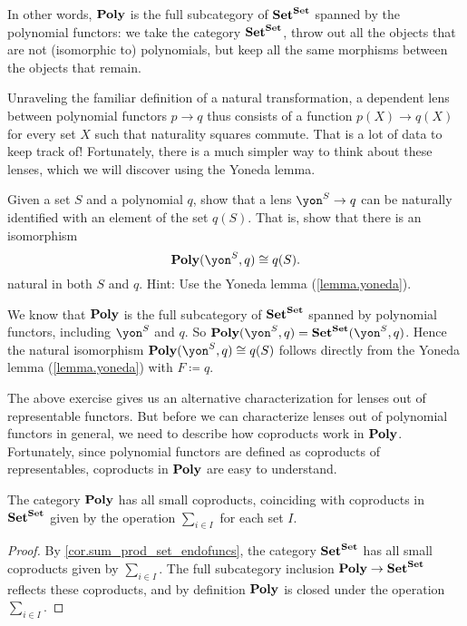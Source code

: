 \documentclass[Book-Poly]{subfiles}
\begin{document}
In other words, $\mathbf{Poly}$ is the full subcategory of $\mathbf{Set}^{\mathbf{Set}}$ spanned by the polynomial functors: we take the category $\mathbf{Set}^{\mathbf{Set}}$, throw out all the objects that are not (isomorphic to) polynomials, but keep all the same morphisms between the objects that remain.


Unraveling the familiar definition of a natural transformation, a dependent lens between polynomial functors $p \to q$ thus consists of a function $p(X) \to q(X)$ for every set $X$ such that naturality squares commute.
That is a lot of data to keep track of!
Fortunately, there is a much simpler way to think about these lenses, which we will discover using the Yoneda lemma.


\begin{exercise} \label{exc.poly_morph_yoneda}
Given a set $S$ and a polynomial $q$, show that a lens $\yon^S \to q$ can be naturally identified with an element of the set $q(S)$.
That is, show that there is an isomorphism
\[
    \poly(\yon^S, q) \iso q(S).
\]
natural in both $S$ and $q$.
Hint: Use the Yoneda lemma (\cref{lemma.yoneda}).
\begin{solution}
We know that $\mathbf{Poly}$ is the full subcategory of $\mathbf{Set}^{\mathbf{Set}}$ spanned by polynomial functors, including $\yon^S$ and $q$.
So $\poly(\yon^S, q)=\smset^\smset(\yon^S, q)$.
Hence the natural isomorphism $\poly(\yon^S, q)\iso q(S)$ follows directly from the Yoneda lemma (\cref{lemma.yoneda}) with $F\coloneqq q$.
\end{solution}
\end{exercise}

The above exercise gives us an alternative characterization for lenses out of representable functors.
But before we can characterize lenses out of polynomial functors in general, we need to describe how coproducts work in $\mathbf{Poly}$.
Fortunately, since polynomial functors are defined as coproducts of representables, coproducts in $\mathbf{Poly}$ are easy to understand.


\begin{proposition} \label{prop.poly_coprods}
  The category $\mathbf{Poly}$ has all small coproducts, coinciding with coproducts in $\mathbf{Set}^{\mathbf{Set}}$ given by the operation $\sum_{i \in I}$ for each set $I$.
\end{proposition}
\begin{proof}
  By \cref{cor.sum_prod_set_endofuncs}, the category $\mathbf{Set}^{\mathbf{Set}}$ has all small coproducts given by $\sum_{i\in I}$.
  The full subcategory inclusion $\mathbf{Poly}\to \mathbf{Set}^{\mathbf{Set}}$ reflects these coproducts, and by definition $\mathbf{Poly}$ is closed under the operation $\sum_{i \in I}$.
\end{proof}
\end{document}

